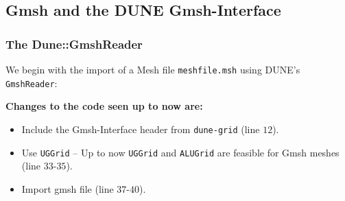 \subsection{Gmsh and the DUNE Gmsh-Interface}

\begin{frame}
  \frametitle{The Dune::GmshReader}
  We begin with the import of a Mesh file \lstinline!meshfile.msh! using DUNE's
  \lstinline!GmshReader!:
  
      \textbf{Changes to the code seen up to now are:}
  \begin{itemize}
    \item Include the Gmsh-Interface header from \lstinline!dune-grid! (line
      $12$).
    \item Use \lstinline!UGGrid! -- Up to now \lstinline!UGGrid! and
      \lstinline!ALUGrid! are feasible for Gmsh meshes (line $33$-$35$).
    \item Import gmsh file (line $37$-$40$).
  \end{itemize}
\end{frame}

